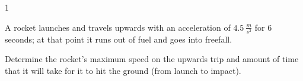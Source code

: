 
\AddToShipoutPicture*{\BackgroundPic}

\addtocounter {ProbNum} {1}

 
{\bf \Large{}} A rocket launches and travels upwards with an acceleration of ${4.5~\tfrac{m}{s^2}}$ for 6 seconds; at that point it runs out of fuel and goes into freefall.   \bigskip

Determine the rocket's maximum speed on the upwards trip and amount of time that it will take for it to hit the ground (from launch to impact).  \vfill




\newpage